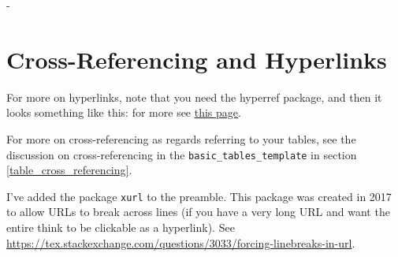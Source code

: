 -\section{Cross-Referencing and Hyperlinks}

For more on hyperlinks, note that you need the hyperref package, and then it looks something like this: for more see \href{https://www.overleaf.com/learn/latex/hyperlinks}{this page}.

For more on cross-referencing as regards referring to your tables, see the discussion on cross-referencing in the \verb+basic_tables_template+ in section \ref{table_cross_referencing}.

I've added the package \verb+xurl+ to the preamble. This package was created in 2017 to allow URLs to break across lines (if you have a very long URL and want the entire think to be clickable as a hyperlink). See \url{https://tex.stackexchange.com/questions/3033/forcing-linebreaks-in-url}.